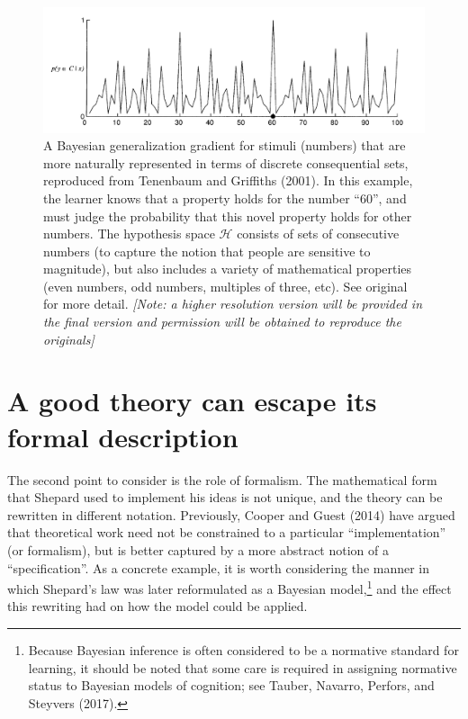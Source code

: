 \documentclass[english,doc]{apa6}
\begin{document}
\begin{figure}[t]
\includegraphics[width=4.58in]{tenenbaum_figure5} \caption{A Bayesian generalization gradient for stimuli (numbers) that are more naturally represented in terms of discrete consequential sets, reproduced from Tenenbaum and Griffiths (2001). In this example, the learner knows that a property holds for the number ``60'', and must judge the probability that this novel property holds for other numbers. The hypothesis space \(\mathcal{H}\) consists of sets of consecutive numbers (to capture the notion that people are sensitive to magnitude), but also includes a variety of mathematical properties (even numbers, odd numbers, multiples of three, etc). See original for more detail. \emph{{[}Note: a higher resolution version will be provided in the final version and permission will be obtained to reproduce the originals{]}}}\label{fig:unnamed-chunk-3}
\end{figure}

\hypertarget{a-good-theory-can-escape-its-formal-description}{%
\section{A good theory can escape its formal description}\label{a-good-theory-can-escape-its-formal-description}}

\noindent
The second point to consider is the role of formalism. The mathematical form that Shepard used to implement his ideas is not unique, and the theory can be rewritten in different notation. Previously, Cooper and Guest (2014) have argued that theoretical work need not be constrained to a particular \enquote{implementation} (or formalism), but is better captured by a more abstract notion of a \enquote{specification}. As a concrete example, it is worth considering the manner in which Shepard's law was later reformulated as a Bayesian model,\footnote{Because Bayesian inference is often considered to be a normative standard for learning, it should be noted that some care is required in assigning normative status to Bayesian models of cognition; see Tauber, Navarro, Perfors, and Steyvers (2017).} and the effect this rewriting had on how the model could be applied.
\end{document}
